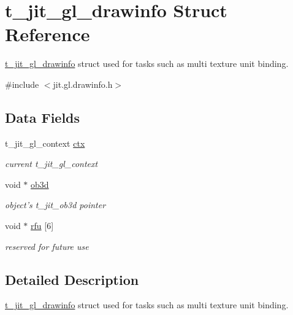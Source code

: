 \hypertarget{structt__jit__gl__drawinfo}{
\section{t\_\-jit\_\-gl\_\-drawinfo Struct Reference}
\label{structt__jit__gl__drawinfo}
}


\hyperlink{structt__jit__gl__drawinfo}{t\_\-jit\_\-gl\_\-drawinfo} struct used for tasks such as multi texture unit binding.  


{\ttfamily \#include $<$jit.gl.drawinfo.h$>$}\subsection*{Data Fields}
\begin{DoxyCompactItemize}
\item 
\hypertarget{structt__jit__gl__drawinfo_a6e0408d15304547e7e4ed86dd766a558}{
t\_\-jit\_\-gl\_\-context \hyperlink{structt__jit__gl__drawinfo_a6e0408d15304547e7e4ed86dd766a558}{ctx}}
\label{structt__jit__gl__drawinfo_a6e0408d15304547e7e4ed86dd766a558}

\begin{DoxyCompactList}\small\item\em current t\_\-jit\_\-gl\_\-context \item\end{DoxyCompactList}\item 
\hypertarget{structt__jit__gl__drawinfo_a05e438523b3fac237bbea2cd94c9c2b8}{
void $\ast$ \hyperlink{structt__jit__gl__drawinfo_a05e438523b3fac237bbea2cd94c9c2b8}{ob3d}}
\label{structt__jit__gl__drawinfo_a05e438523b3fac237bbea2cd94c9c2b8}

\begin{DoxyCompactList}\small\item\em object's t\_\-jit\_\-ob3d pointer \item\end{DoxyCompactList}\item 
\hypertarget{structt__jit__gl__drawinfo_a6cce9429de00619236b894fea9208ecb}{
void $\ast$ \hyperlink{structt__jit__gl__drawinfo_a6cce9429de00619236b894fea9208ecb}{rfu} \mbox{[}6\mbox{]}}
\label{structt__jit__gl__drawinfo_a6cce9429de00619236b894fea9208ecb}

\begin{DoxyCompactList}\small\item\em reserved for future use \item\end{DoxyCompactList}\end{DoxyCompactItemize}


\subsection{Detailed Description}
\hyperlink{structt__jit__gl__drawinfo}{t\_\-jit\_\-gl\_\-drawinfo} struct used for tasks such as multi texture unit binding. 